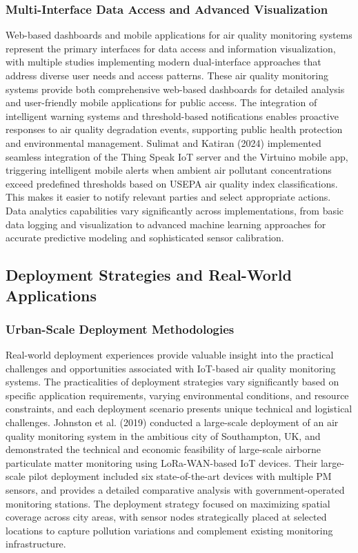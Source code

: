 \documentclass[conference]{IEEEtran}
\begin{document}
\subsubsection{Multi-Interface Data Access and Advanced Visualization}
Web-based dashboards and mobile applications for air quality monitoring systems represent the primary interfaces for data access and information visualization, with multiple studies implementing modern dual-interface approaches that address diverse user needs and access patterns. These air quality monitoring systems provide both comprehensive web-based dashboards for detailed analysis and user-friendly mobile applications for public access. The integration of intelligent warning systems and threshold-based notifications enables proactive responses to air quality degradation events, supporting public health protection and environmental management. Sulimat and Katiran (2024) implemented seamless integration of the Thing Speak IoT server and the Virtuino mobile app, triggering intelligent mobile alerts when ambient air pollutant concentrations exceed predefined thresholds based on USEPA air quality index classifications. This makes it easier to notify relevant parties and select appropriate actions. Data analytics capabilities vary significantly across implementations, from basic data logging and visualization to advanced machine learning approaches for accurate predictive modeling and sophisticated sensor calibration.~\cite{sulimat2024}

\subsection{Deployment Strategies and Real-World Applications}
\subsubsection{Urban-Scale Deployment Methodologies}
Real-world deployment experiences provide valuable insight into the practical challenges and opportunities associated with IoT-based air quality monitoring systems. The practicalities of deployment strategies vary significantly based on specific application requirements, varying environmental conditions, and resource constraints, and each deployment scenario presents unique technical and logistical challenges. Johnston et al. (2019) conducted a large-scale deployment of an air quality monitoring system in the ambitious city of Southampton, UK, and demonstrated the technical and economic feasibility of large-scale airborne particulate matter monitoring using LoRa-WAN-based IoT devices. Their large-scale pilot deployment included six state-of-the-art devices with multiple PM sensors, and provides a detailed comparative analysis with government-operated monitoring stations. The deployment strategy focused on maximizing spatial coverage across city areas, with sensor nodes strategically placed at selected locations to capture pollution variations and complement existing monitoring infrastructure.~\cite{johnston2019}
\end{document}
